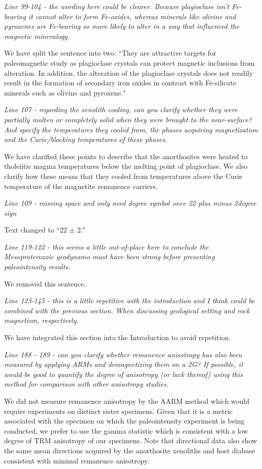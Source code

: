 \documentclass[11pt, letterpaper]{article}
\begin{document}
\begin{flushleft}
\textit{Line 99-104 - the wording here could be clearer. Because plagioclase isn't Fe-bearing it cannot alter to form Fe-oxides, whereas minerals like olivine and pyroxenes are Fe-bearing so more likely to alter in a way that influenced the magnetic mineralogy.}

We have split the sentence into two: ``They are attractive targets for paleomagnetic study as plagioclase crystals can protect magnetic inclusions from alteration. In addition, the alteration of the plagioclase crystals does not readily result in the formation of secondary iron oxides in contrast with Fe-silicate minerals such as olivine and pyroxene."

\textit{Line 107 - regarding the xenolith cooling, can you clarify whether they were partially molten or completely solid when they were brought to the near-surface? And specify the temperatures they cooled from, the phases acquiring magnetization and the Curie/blocking temperatures of these phases.}

We have clarified these points to describe that the anorthosites were heated to tholeiitic magma temperatures below the melting point of plagioclase. We also clarify how these means that they cooled from temperatures above the Curie temperature of the magnetite remanence carriers. 

\textit{Line 109 - missing space and only need degree symbol once 22 {plus minus} 2{degree sign}}

Text changed to ``22 $\pm$ 2\textdegree."

\textit{Line 119-122 - this seems a little out-of-place here to conclude the Mesoproterozoic geodynamo must have been strong before presenting paleointensity results.}

We removed this sentence. 

\textit{Line 123-145 - this is a little repetitive with the introduction and I think could be combined with the previous section. When discussing geological setting and rock magnetism, respectively.}

We have integrated this section into the Introduction to avoid repetition. 

\textit{Line 188 - 189 - can you clarify whether remanence anisotropy has also been measured by applying ARMs and demagnetizing them on a 2G? If possible, it would be good to quantify the degree of anisotropy (or lack thereof) using this method for comparison with other anisotropy studies.}

We did not measure remanence anisotropy by the AARM method which would require experiments on distinct sister specimens. Given that it is a metric associated with the specimen on which the paleointensity experiment is being conducted, we prefer to use the gamma statistic which is consistent  with a low degree of TRM anisotropy of our specimens. Note that directional data also show the same mean directions acquired by the anorthosite xenoliths and host diabase consistent with minimal remanence anisotropy.


\end{flushleft}
\end{document}
